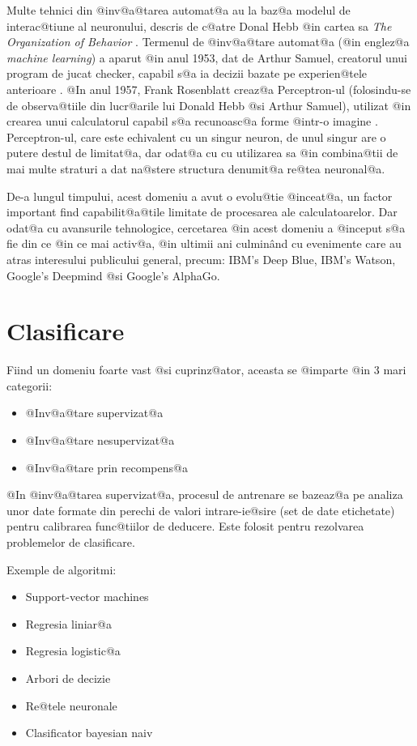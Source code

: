  Multe tehnici din @inv@a@tarea automat@a au la baz@a modelul de interac@tiune al neuronului, descris de c@atre Donal Hebb @in cartea sa {\sl The Organization of Behavior} \cite{donald-hebb-book}. Termenul de @inv@a@tare automat@a (@in englez@a {\sl machine learning}) a aparut @in anul 1953, dat de Arthur Samuel, creatorul unui program de jucat checker, capabil s@a ia decizii bazate pe experien@tele anterioare \cite{arthur-samuel}. @In anul 1957, Frank Rosenblatt creaz@a Perceptron-ul (folosindu-se de observa@tiile din lucr@arile lui Donald Hebb @si Arthur Samuel), utilizat @in crearea unui calculatorul capabil s@a recunoasc@a forme @intr-o imagine . Perceptron-ul, care este echivalent cu un singur neuron, de unul singur are o putere destul de limitat@a, dar odat@a cu cu  utilizarea sa @in combina@tii de mai multe straturi a dat na@stere structura denumit@a re@tea neuronal@a. 
 
 De-a lungul timpului, acest domeniu a avut o evolu@tie @inceat@a, un factor important find capabilit@a@tile limitate de procesarea ale calculatoarelor. Dar odat@a cu avansurile tehnologice, cercetarea @in acest domeniu a @inceput s@a fie din ce @in ce mai activ@a, @in ultimii ani culmin\^ and cu evenimente care au atras interesului publicului general, precum: IBM's Deep Blue, IBM's Watson, Google's Deepmind @si Google's AlphaGo.
 
 
\newpage

\section{Clasificare}

Fiind un domeniu foarte vast @si cuprinz@ator, aceasta se @imparte @in 3 mari categorii:
\hspace{0.2cm}\begin{itemize}
	\item @Inv@a@tare supervizat@a
	\item @Inv@a@tare nesupervizat@a
	\item @Inv@a@tare prin recompens@a
\end{itemize}

\vspace{0.3cm}
@In @inv@a@tarea supervizat@a, procesul de antrenare se bazeaz@a pe analiza unor date formate din perechi de valori intrare-ie@sire (set de date etichetate) pentru calibrarea func@tiilor de deducere. Este folosit pentru rezolvarea problemelor de clasificare.

Exemple de algoritmi:
\begin{itemize}
	\item Support-vector machines
	\item Regresia liniar@a
	\item Regresia logistic@a
	\item Arbori de decizie
	\item Re@tele neuronale
	\item Clasificator bayesian naiv
\end{itemize}

